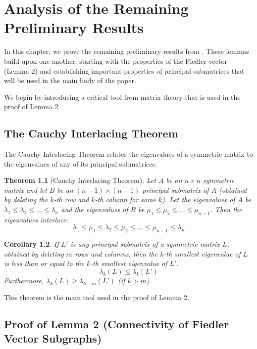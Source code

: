 \documentclass[12pt,a4paper]{report}
\theoremstyle{plain}
\newtheorem{theorem}{Theorem}[section]
\newtheorem{corollary}[theorem]{Corollary}
\theoremstyle{definition}
\theoremstyle{remark}
\begin{document}


\chapter{Analysis of the Remaining Preliminary Results}

In this chapter, we prove the remaining preliminary results from \cite{main_paper}. These lemmas build upon one another, starting with the properties of the Fiedler vector (Lemma 2) and establishing important properties of principal submatrices that will be used in the main body of the paper.

We begin by introducing a critical tool from matrix theory that is used in the proof of Lemma 2.

\section{The Cauchy Interlacing Theorem}

The Cauchy Interlacing Theorem relates the eigenvalues of a symmetric matrix to the eigenvalues of any of its principal submatrices.

\begin{theorem}[Cauchy Interlacing Theorem]\label{thm:cauchy}
Let $A$ be an $n \times n$ symmetric matrix and let $B$ be an $(n-1) \times (n-1)$ principal submatrix of $A$ (obtained by deleting the $k$-th row and $k$-th column for some $k$). Let the eigenvalues of $A$ be $\lambda_1 \le \lambda_2 \le \dots \le \lambda_n$ and the eigenvalues of $B$ be $\mu_1 \le \mu_2 \le \dots \le \mu_{n-1}$.
Then the eigenvalues interlace:
$$ \lambda_1 \le \mu_1 \le \lambda_2 \le \mu_2 \le \dots \le \mu_{n-1} \le \lambda_n $$
\end{theorem}

\begin{corollary}\label{cor:cauchy}
If $L'$ is any principal submatrix of a symmetric matrix $L$, obtained by deleting $m$ rows and columns, then the $k$-th smallest eigenvalue of $L$ is less than or equal to the $k$-th smallest eigenvalue of $L'$.
$$ \lambda_k(L) \le \lambda_k(L') $$
Furthermore, $\lambda_k(L) \ge \lambda_{k-m}(L')$ (if $k > m$).
\end{corollary}

This theorem is the main tool used in the proof of Lemma 2.

\section{Proof of Lemma 2 (Connectivity of Fiedler Vector Subgraphs)}
\end{document}
